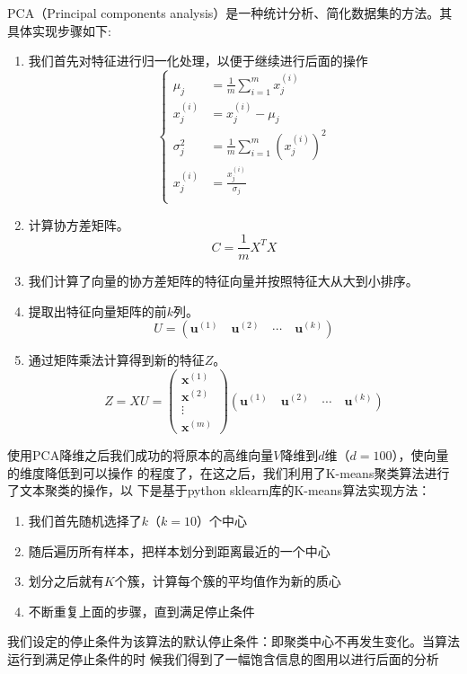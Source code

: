 PCA（Principal components analysis）是一种统计分析、简化数据集的方法。其具体实现步骤如下:
\begin{enumerate}
    \item 我们首先对特征进行归一化处理，以便于继续进行后面的操作
        \begin{equation}
            \left\{
            \begin{aligned}
                \mu_{j}&=\frac{1}{m} \sum_{i=1}^{m} x_{j}^{(i)} \\
                x_{j}^{(i)}&=x_{j}^{(i)}-\mu_{j} \\
                \sigma_{j}^{2}&=\frac{1}{m}
                \sum_{i=1}^{m}\left(x_{j}^{(i)}\right)^{2} \\
                x_{j}^{(i)}&=\frac{x_{j}^{(i)}}{\sigma_{j}} \\
            \end{aligned}
            \right.
        \end{equation}
    \item 计算协方差矩阵。\begin{equation}
        C=\frac{1}{m} X^{T} X
    \end{equation}
    \item 我们计算了向量的协方差矩阵的特征向量并按照特征大从大到小排序。
    \item 提取出特征向量矩阵的前$k$列。\begin{equation}
        U=\left(
            \boldsymbol u^{(1)} \quad \boldsymbol u^{(2)} \quad \cdots \quad \boldsymbol u^{(k)}
            \right)
    \end{equation}
    \item 通过矩阵乘法计算得到新的特征$Z$。\begin{equation}
            Z=X U=\left(\begin{array}{c}
            \boldsymbol x^{(1)} \\
            \boldsymbol x^{(2)} \\
            \vdots \\
            \boldsymbol x^{(m)}
            \end{array}\right)
            \left( \boldsymbol u^{(1)} \quad \boldsymbol u^{(2)} \quad \cdots
            \quad \boldsymbol u^{(k)} \right)
    \end{equation}
\end{enumerate}
使用PCA降维之后我们成功的将原本的高维向量$V$降维到$d$维（$d=100$），使向量的维度降低到可以操作
的程度了，在这之后，我们利用了K-means聚类算法进行了文本聚类的操作，以
下是基于python sklearn库的K-means算法实现方法：
\begin{enumerate}
    \item 我们首先随机选择了$k$（$k=10$）个中心
    \item 随后遍历所有样本，把样本划分到距离最近的一个中心
    \item 划分之后就有$K$个簇，计算每个簇的平均值作为新的质心
    \item 不断重复上面的步骤，直到满足停止条件
\end{enumerate}
我们设定的停止条件为该算法的默认停止条件：即聚类中心不再发生变化。当算法运行到满足停止条件的时
候我们得到了一幅饱含信息的图用以进行后面的分析

